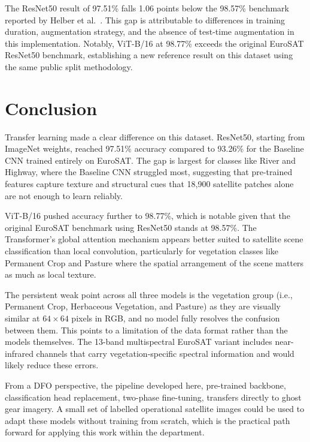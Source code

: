 \documentclass[12pt, letterpaper]{article}
\begin{document}
The ResNet50 result of 97.51\% falls 1.06 points below the 98.57\% benchmark reported by Helber et al.\ \cite{helber2019eurosat}. This gap is attributable to differences in training duration, augmentation strategy, and the absence of test-time augmentation in this implementation. Notably, ViT-B/16 at 98.77\% exceeds the original EuroSAT ResNet50 benchmark, establishing a new reference result on this dataset using the same public split methodology.

\section*{Conclusion}

Transfer learning made a clear difference on this dataset. ResNet50, starting from ImageNet weights, reached 97.51\% accuracy compared to 93.26\% for the Baseline CNN trained entirely on EuroSAT. The gap is largest for classes like River and Highway, where the Baseline CNN struggled most, suggesting that pre-trained features capture texture and structural cues that 18,900 satellite patches alone are not enough to learn reliably.

ViT-B/16 pushed accuracy further to 98.77\%, which is notable given that the original EuroSAT benchmark using ResNet50 stands at 98.57\%. The Transformer's global attention mechanism appears better suited to satellite scene classification than local convolution, particularly for vegetation classes like Permanent Crop and Pasture where the spatial arrangement of the scene matters as much as local texture.

The persistent weak point across all three models is the vegetation group (i.e., Permanent Crop, Herbaceous Vegetation, and Pasture) as they are visually similar at $64 \times 64$ pixels in RGB, and no model fully resolves the confusion between them. This points to a limitation of the data format rather than the models themselves. The 13-band multispectral EuroSAT variant includes near-infrared channels that carry vegetation-specific spectral information and would likely reduce these errors.

From a DFO perspective, the pipeline developed here, pre-trained backbone,
classification head replacement, two-phase fine-tuning, transfers directly to ghost gear imagery. A small set of labelled operational satellite images could be used to adapt these models without training from scratch, which is the practical path forward for applying this work within the department.
\end{document}
